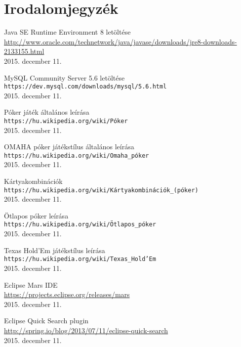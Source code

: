 \part{Irodalomjegyzék}

\begin{thebibliography}{9}

Java SE Runtime Environment 8 letöltése \\
\url{http://www.oracle.com/technetwork/java/javase/downloads/jre8-downloads-2133155.html}\\
2015. december 11.

MySQL Community Server 5.6 letöltése \\
\texttt{https://dev.mysql.com/downloads/mysql/5.6.html}\\
2015. december 11.

Póker játék általános leírása\\
\texttt{https://hu.wikipedia.org/wiki/Póker}\\
2015. december 11.

OMAHA póker játékstílus általános leírása \\
\texttt{https://hu.wikipedia.org/wiki/Omaha\_póker}\\
2015. december 11.

Kártyakombinációk \\
\texttt{https://hu.wikipedia.org/wiki/Kártyakombinációk\_(póker)}\\
2015. december 11.

Ötlapos póker leírása \\
\texttt{https://hu.wikipedia.org/wiki/Ötlapos\_póker}\\
2015. december 11.

Texas Hold'Em játékstílus leírása\\
\texttt{https://hu.wikipedia.org/wiki/Texas\_Hold'Em}\\
2015. december 11.

Eclipse Mars IDE \\
\url{https://projects.eclipse.org/releases/mars}\\
2015. december 11.

Eclipse Quick Search plugin \\
\url{http://spring.io/blog/2013/07/11/eclipse-quick-search}\\
2015. december 11.


\end{thebibliography}
